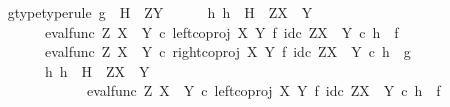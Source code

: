 \begin{isabellebody}
\ \ \ \ \isamarkupfalse%
\ g{\isacharunderscore}{\kern0pt}type{\isacharbrackleft}{\kern0pt}type{\isacharunderscore}{\kern0pt}rule{\isacharbrackright}{\kern0pt}{\isacharcolon}{\kern0pt}\ {\isachardoublequoteopen}g\ {\isacharcolon}{\kern0pt}\ H\ {\isasymrightarrow}\ Z\isactrlbsup Y\isactrlesup {\isachardoublequoteclose}\isanewline
\ \ \ \ \isamarkupfalse%
\ {\isachardoublequoteopen}{\isasymexists}h{\isachardot}{\kern0pt}\ h\ {\isacharcolon}{\kern0pt}\ H\ {\isasymrightarrow}\ Z\isactrlbsup {\isacharparenleft}{\kern0pt}X\ {\isasymCoprod}\ Y{\isacharparenright}{\kern0pt}\isactrlesup \ {\isasymand}\isanewline
\ \ \ \ \ \ \ \ \ \ \ {\isacharparenleft}{\kern0pt}eval{\isacharunderscore}{\kern0pt}func\ Z\ {\isacharparenleft}{\kern0pt}X\ {\isasymCoprod}\ Y{\isacharparenright}{\kern0pt}\ {\isasymcirc}\isactrlsub c\ left{\isacharunderscore}{\kern0pt}coproj\ X\ Y\ {\isasymtimes}\isactrlsub f\ id\isactrlsub c\ {\isacharparenleft}{\kern0pt}Z\isactrlbsup {\isacharparenleft}{\kern0pt}X\ {\isasymCoprod}\ Y{\isacharparenright}{\kern0pt}\isactrlesup {\isacharparenright}{\kern0pt}{\isacharparenright}{\kern0pt}\isactrlsup {\isasymsharp}\ {\isasymcirc}\isactrlsub c\ h\ {\isacharequal}{\kern0pt}\ f\ {\isasymand}\isanewline
\ \ \ \ \ \ \ \ \ \ \ {\isacharparenleft}{\kern0pt}eval{\isacharunderscore}{\kern0pt}func\ Z\ {\isacharparenleft}{\kern0pt}X\ {\isasymCoprod}\ Y{\isacharparenright}{\kern0pt}\ {\isasymcirc}\isactrlsub c\ right{\isacharunderscore}{\kern0pt}coproj\ X\ Y\ {\isasymtimes}\isactrlsub f\ id\isactrlsub c\ {\isacharparenleft}{\kern0pt}Z\isactrlbsup {\isacharparenleft}{\kern0pt}X\ {\isasymCoprod}\ Y{\isacharparenright}{\kern0pt}\isactrlesup {\isacharparenright}{\kern0pt}{\isacharparenright}{\kern0pt}\isactrlsup {\isasymsharp}\ {\isasymcirc}\isactrlsub c\ h\ {\isacharequal}{\kern0pt}\ g\ {\isasymand}\isanewline
\ \ \ \ \ \ \ \ \ \ \ {\isacharparenleft}{\kern0pt}{\isasymforall}h{}{\isachardot}{\kern0pt}\ h{}\ {\isacharcolon}{\kern0pt}\ H\ {\isasymrightarrow}\ Z\isactrlbsup {\isacharparenleft}{\kern0pt}X\ {\isasymCoprod}\ Y{\isacharparenright}{\kern0pt}\isactrlesup \ {\isasymand}\isanewline
\ \ \ \ \ \ \ \ \ \ \ \ \ \ \ \ \ {\isacharparenleft}{\kern0pt}eval{\isacharunderscore}{\kern0pt}func\ Z\ {\isacharparenleft}{\kern0pt}X\ {\isasymCoprod}\ Y{\isacharparenright}{\kern0pt}\ {\isasymcirc}\isactrlsub c\ left{\isacharunderscore}{\kern0pt}coproj\ X\ Y\ {\isasymtimes}\isactrlsub f\ id\isactrlsub c\ {\isacharparenleft}{\kern0pt}Z\isactrlbsup {\isacharparenleft}{\kern0pt}X\ {\isasymCoprod}\ Y{\isacharparenright}{\kern0pt}\isactrlesup {\isacharparenright}{\kern0pt}{\isacharparenright}{\kern0pt}\isactrlsup {\isasymsharp}\ {\isasymcirc}\isactrlsub c\ h{}\ {\isacharequal}{\kern0pt}\ f\ {\isasymand}\isanewline

\end{isabellebody}
